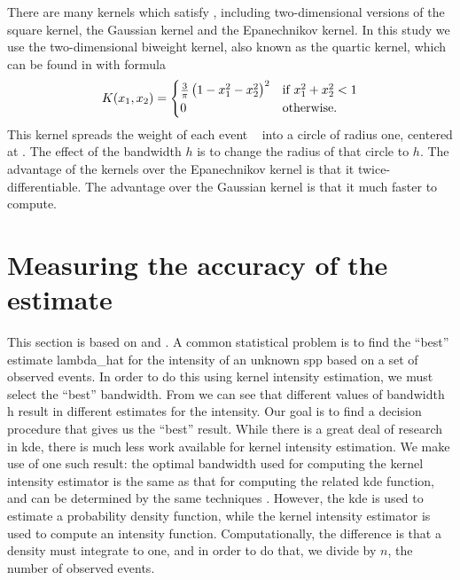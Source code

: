There are many kernels which satisfy ,
including two-dimensional versions of the square kernel, the Gaussian kernel and the Epanechnikov kernel.
In this study we use the two-dimensional biweight kernel,
also known as the quartic kernel,
which can be found in \citet{silverman1986density} with formula
\begin{equation}
    \label{eq:biweightkernel2d}
    K \xvec =%
    \begin{cases}%
        \frac{3}{\pi}\left( 1 - x_1^2 - x_2^2 \right)^2 & \text{if}~x_1^2+x_2^2<1 \\%
        0 & \text{otherwise.}%
    \end{cases}%
\end{equation}
This kernel spreads the weight of each event \xvec~ into a circle of radius one, centered at \xvec.
The effect of the bandwidth $h$ is to change the radius of that circle to $h$.
The advantage of the kernels over the Epanechnikov kernel is that it twice-differentiable.
The advantage over the Gaussian kernel is that it much faster to compute.

\section{Measuring the accuracy of the estimate}
\label{sec:theory:accuracy}

This section is based on \citet{silverman1986density} and \citet{wand1994kernel}.
A common statistical problem is to find the ``best'' estimate \gls{lambda_hat}
for the \gls{intensity} of an unknown \gls{spp}
based on a set of observed \glspl{event}.
In order to do this using \gls{kernel intensity estimation},
we must select the ``best'' bandwidth.
From  we can see that different values of bandwidth \gls{h} result in different estimates for the \gls{intensity}.
Our goal is to find a decision procedure that gives us the ``best'' result.
While there is a great deal of research in \gls{kde},
there is much less work available for \gls{kernel intensity estimation}.
We make use of one such result:
the optimal bandwidth used for computing the \gls{kernel intensity estimator} is the same as that for computing the related \gls{kde} function,
and can be determined by the same techniques .
However, the \gls{kde} is used to estimate a probability density function,
while the \gls{kernel intensity estimator} is used to compute an intensity function.
Computationally, the difference is that a density must integrate to one,
and in order to do that,
we divide by $n$,
the number of observed events.


